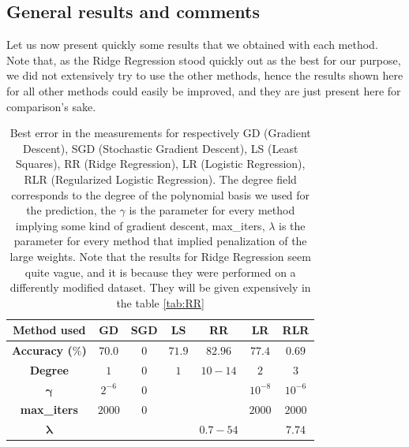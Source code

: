 \documentclass[10pt,conference,compsocconf]{IEEEtran}
\begin{document}
\subsection{General results and comments}
Let us now present quickly some results that we obtained with each method. Note that, as the Ridge Regression stood quickly out as the best for our purpose, we did not extensively try to use the other methods, hence the results shown here for all other methods could easily be improved, and they are just present here for comparison's sake.
\begin{table}[!h]
	\centering
	\begin{tabular}{c||c|c|c|c|c|c}
		\textbf{Method used} & GD & SGD & LS & RR & LR & RLR  \\
		\hline
		\textbf{Accuracy ($\%$)} & $70.0$&$0$&$71.9$&$82.96$&$77.4$&$0.69$\\
		\hline
		\textbf{Degree} & $1$ &0&$1$&$10-14$&$2$&$3$\\
		\hline
		$\mathbf{\gamma}$ & $2^{-6}$&0&\diagbox{}&\diagbox{}&$10^{-8}$&$10^{-6}$\\
		\hline
		\textbf{max\_iters} & $2000$&0&\diagbox{}&\diagbox{}&$2000$&$2000$\\
		\hline
		$\mathbf{\lambda}$ & \diagbox{}&\diagbox{}&\diagbox{}&$0.7-54$&\diagbox{}&$7.74$\\
		
	\end{tabular}
	
	\caption{Best error in the measurements for respectively GD (Gradient Descent), SGD (Stochastic Gradient Descent), LS (Least Squares), RR (Ridge Regression), LR (Logistic Regression), RLR (Regularized Logistic Regression). The degree field corresponds to the degree of the polynomial basis we used for the prediction, the $\gamma$ is the parameter for every method implying some kind of gradient descent, max\_iters, $\lambda$ is the parameter for every method that implied penalization of the large weights. Note that the results for Ridge Regression seem quite vague, and it is because they were performed on a differently modified dataset. They will be given expensively in the table \ref{tab:RR}}
	\label{tab:results}
\end{table}
\end{document}
